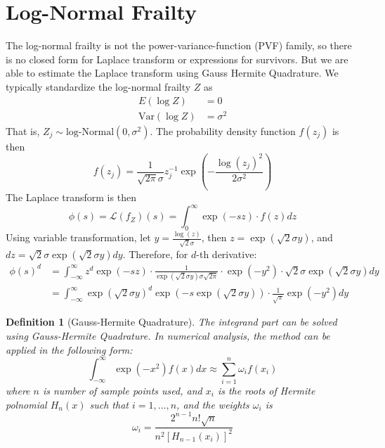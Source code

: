 \documentclass[preprint,12pt]{elsarticle}
\newtheorem{defn}{Definition}
\begin{document}
\section{Log-Normal Frailty}
The log-normal frailty is not the power-variance-function (PVF) family, so there is no closed form for Laplace transform or expressions for survivors. But we are able to estimate the Laplace transform using Gauss Hermite Quadrature. We typically standardize the log-normal frailty $Z$ as
\begin{align} 
    E(\log Z)&=0\\
    \text{Var}(\log Z)&=\sigma^2
\end{align} 
That is, $Z_j\sim \text{log-Normal}(0, \sigma^2)$. The probability density function $f(z_j)$ is then
\begin{equation}\label{eq:lognormalfrailty}
    f(z_j)=\frac{1}{\sqrt{2\pi}\sigma}z_j^{-1}\exp (-\frac{\log (z_j)^2}{2\sigma^2})
\end{equation}
The Laplace transform is then
\begin{equation}
    \phi(s)=\mathscr{L}(f_Z)(s)=\int_0^{\infty}\exp(-sz)\cdot f(z)dz
\end{equation}
Using variable transformation, let $y=\frac{\log(z)}{\sqrt{2}\sigma}$, then $z=\exp(\sqrt{2}\sigma y)$, and $dz=\sqrt{2}\sigma\exp(\sqrt{2}\sigma y)dy$. Therefore, for $d$-th derivative:
\begin{align}
    \phi(s)^d&=\int_{-\infty}^{\infty}z^d\exp(-sz)\cdot\frac{1}{\exp(\sqrt{2}\sigma y)\sigma\sqrt{2\pi}}\cdot\exp(-y^2)\cdot\sqrt{2}\sigma\exp(\sqrt{2}\sigma y)dy\\
    &=\int_{-\infty}^{\infty}\exp(\sqrt{2}\sigma y)^d\exp(-s\exp(\sqrt{2}\sigma y))\cdot\frac{1}{\sqrt{\pi}}\exp(-y^2)dy
\end{align}
\begin{defn}[Gauss-Hermite Quadrature]\label{defn:gausshermite}
    The integrand part can be solved using Gauss-Hermite Quadrature. In numerical analysis, the method can be applied in the following form:
\begin{equation}
    \int_{-\infty}^{\infty}\exp(-x^2)f(x)dx\approx \sum_{i=1}^n\omega_i f(x_i)
\end{equation}
where $n$ is number of sample points used, and $x_i$ is the roots of Hermite polnomial $H_n (x)$ such that $i=1, ..., n$, and the weights $\omega_i$ is 
\begin{equation}
    \omega_i=\frac{2^{n-1}n!\sqrt{n}}{n^2[H_{n-1}(x_i)]^2}
\end{equation}
\end{defn}
\end{document}
